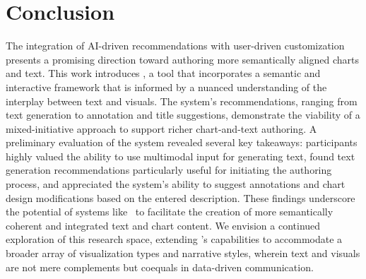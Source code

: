 \section{Conclusion}

The integration of AI-driven recommendations with user-driven customization presents a promising direction toward authoring more semantically aligned charts and text. This work introduces \pluto, a tool that incorporates a semantic and interactive framework that is informed by a nuanced understanding of the interplay between text and visuals. The system's recommendations, ranging from text generation to annotation and title suggestions, demonstrate the viability of a mixed-initiative approach to support richer chart-and-text authoring. 
A preliminary evaluation of the system revealed several key takeaways: participants highly valued the ability to use multimodal input for generating text, found text generation recommendations particularly useful for initiating the authoring process, and appreciated the system's ability to suggest annotations and chart design modifications based on the entered description. These findings underscore the potential of systems like \pluto~to facilitate the creation of more semantically coherent and integrated text and chart content. We envision a continued exploration of this research space, extending \pluto's capabilities to accommodate a broader array of visualization types and narrative styles, wherein text and visuals are not mere complements but coequals in data-driven communication.